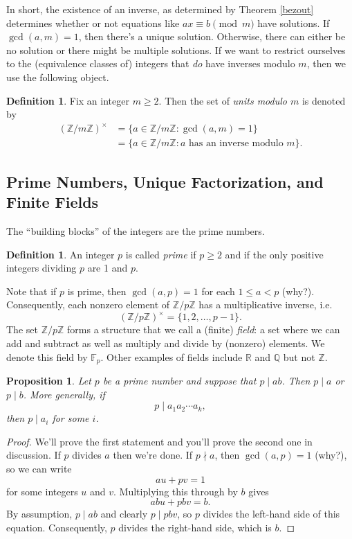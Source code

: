 \documentclass[12pt]{article}
\theoremstyle{plain}
\newtheorem{proposition}[theorem]{Proposition}
\theoremstyle{definition}
\newtheorem{definition}[theorem]{Definition}
\theoremstyle{remark}
\newcommand{\Z}{\mathbb{Z}}
\newcommand{\R}{\mathbb{R}}
\newcommand{\Q}{\mathbb{Q}}
\newcommand{\F}{\mathbb{F}}
\begin{document}
In short, the existence of an inverse, as determined by Theorem \ref{bezout} determines whether or not equations like $ax \equiv b\pmod m$ have solutions.
If $\gcd(a, m) = 1$, then there's a unique solution.
Otherwise, there can either be no solution or there might be multiple solutions.
If we want to restrict ourselves to the (equivalence classes of) integers that \emph{do} have inverses modulo $m$, then we use the following object.

\begin{definition}
    Fix an integer $m\geq 2$. Then the set of \emph{units modulo $m$} is denoted by
    \begin{align*}
        (\Z/m\Z)^\times &= \{a\in \Z/m\Z: \gcd(a,m) = 1\}\\
        &= \{a\in \Z/m\Z: a\text{ has an inverse modulo }m\}.
    \end{align*}
\end{definition}










\subsection{Prime Numbers, Unique Factorization, and Finite Fields}

The ``building blocks'' of the integers are the prime numbers.
\begin{definition}
    An integer $p$ is called \emph{prime} if $p\geq 2$ and if the only positive integers dividing $p$ are 1 and $p$.
\end{definition}

Note that if $p$ is prime, then $\gcd(a,p) = 1$ for each $1\leq a < p$ (why?).
Consequently, each nonzero element of $\Z/p\Z$ has a multiplicative inverse, i.e.
\[
    (\Z/p\Z)^\times = \{1, 2, \ldots, p-1\}.
\]
The set $\Z/p\Z$ forms a structure that we call a (finite) \emph{field}: a set where we can add and subtract as well as multiply and divide by (nonzero) elements.
We denote this field by $\F_p$.
Other examples of fields include $\R$ and $\Q$ but not $\Z$.

\begin{proposition}\label{prime divides product}
    Let $p$ be a prime number and suppose that $p \mid ab$.
    Then $p\mid a$ or $p\mid b$.
    More generally, if
    \[
        p\mid a_1a_2\cdots a_k,
    \]
    then $p\mid a_i$ for some $i$.
\end{proposition}
\begin{proof}
    We'll prove the first statement and you'll prove the second one in discussion.
    If $p$ divides $a$ then we're done.
    If $p\nmid a$, then $\gcd(a,p) = 1$ (why?), so we can write
    \[
        au + pv = 1
    \]
    for some integers $u$ and $v$.
    Multiplying this through by $b$ gives
    \[
        abu + pbv = b.
    \]
    By assumption, $p\mid ab$ and clearly $p\mid pbv$, so $p$ divides the left-hand side of this equation. Consequently, $p$ divides the right-hand side, which is $b$.
\end{proof}
\end{document}
